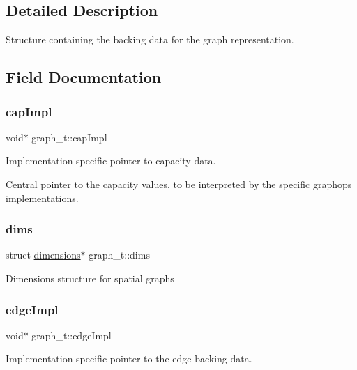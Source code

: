 \subsection{Detailed Description}
Structure containing the backing data for the graph representation. 

\subsection{Field Documentation}
\mbox{\label{structgraph__t_ab85359c7dfbc46f84976a85c4104b1f5}} 
\subsubsection{\texorpdfstring{cap\+Impl}{capImpl}}
{\footnotesize\ttfamily void$\ast$ graph\+\_\+t\+::cap\+Impl}



Implementation-\/specific pointer to capacity data. 

Central pointer to the capacity values, to be interpreted by the specific graphops implementations. \mbox{\label{structgraph__t_ab0b7dd9b19e20a1564ba1f02ad41511e}} 
\subsubsection{\texorpdfstring{dims}{dims}}
{\footnotesize\ttfamily struct \hyperlink{graphdata_8h_a08b79828d8e700b1ff86fc235a83089f}{dimensions}$\ast$ graph\+\_\+t\+::dims}

Dimensions structure for spatial graphs \mbox{\label{structgraph__t_acadea26a56e788cb109413045138faba}} 
\subsubsection{\texorpdfstring{edge\+Impl}{edgeImpl}}
{\footnotesize\ttfamily void$\ast$ graph\+\_\+t\+::edge\+Impl}



Implementation-\/specific pointer to the edge backing data. 

